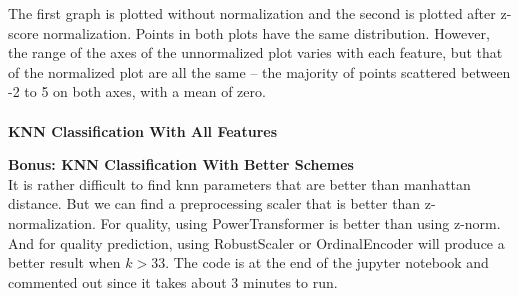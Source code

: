 \documentclass[12pt]{article}
\begin{document}
\noindent
The first graph is plotted without normalization and the second is plotted after z-score normalization. Points in both plots have the same distribution. However, the range of the axes of the unnormalized plot varies with each feature, but that of the normalized plot are all the same -- the majority of points scattered between -2 to 5 on both axes, with a mean of zero.\\\\
\textbf{KNN Classification With All Features}
\begin{figure}[H]
\captionsetup[subfigure]{labelformat=empty}
\centering
{}
\end{figure}
\noindent
\textbf{Bonus: KNN Classification With Better Schemes}\\
It is rather difficult to find knn parameters that are better than manhattan distance. But we can find a preprocessing scaler that is better than z-normalization. For quality, using PowerTransformer is better than using z-norm. And for quality prediction, using RobustScaler or OrdinalEncoder will produce a better result when $k>33$. The code is at the end of the jupyter notebook and commented out since it takes about 3 minutes to run.
\end{document}
